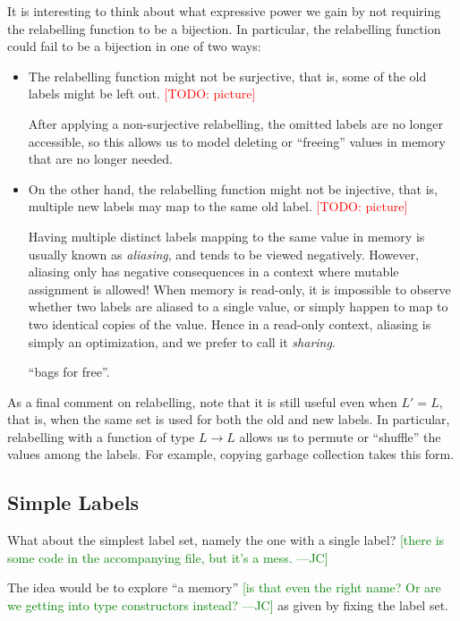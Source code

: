 \documentclass{jfp}
\newcommand{\term}[1]{\emph{#1}}
\newcommand{\authornote}[3]{\textcolor{#1}{[#3 ---#2]}}
\newcommand{\todo}[1]{\textcolor{red}{[TODO: #1]}}
\newcommand{\authornote}[3]{}
\newcommand{\todo}[1]{}
\newcommand{\jc}[1]{\authornote{green}{JC}{#1}}  %
\begin{document}
It is interesting to think about what expressive power we gain by not
requiring the relabelling function to be a bijection.  In particular,
the relabelling function could fail to be a bijection in one of two
ways:

\begin{itemize}
\item The relabelling function might not be surjective, that is, some
  of the old labels might be left out.   \todo{picture}

  After applying a non-surjective relabelling, the omitted labels are
  no longer accessible, so this allows us to model deleting or
  ``freeing'' values in memory that are no longer needed.
\item On the other hand, the relabelling function might not be
  injective, that is, multiple new labels may map to the same old
  label.  \todo{picture}

  Having multiple distinct labels mapping to the same value in memory
  is usually known as \term{aliasing}, and tends to be viewed
  negatively.  However, aliasing only has negative consequences in a
  context where mutable assignment is allowed!  When memory is
  read-only, it is impossible to observe whether two labels are
  aliased to a single value, or simply happen to map to two identical
  copies of the value.  Hence in a read-only context, aliasing is
  simply an optimization, and we prefer to call it \term{sharing}.

  \begin{commentary}
  ``bags for free''.
  \end{commentary}
\end{itemize}

As a final comment on relabelling, note that it is still useful even
when $L' = L$, that is, when the same set is used for both the old and
new labels.  In particular, relabelling with a function of type
$L \to L$ allows us to permute or ``shuffle'' the values among the
labels.  For example, copying garbage collection takes this form.

\subsection{Simple Labels}

What about the simplest label set, namely the one with a single label?
\jc{there is some code in the accompanying file, but it's a mess.}

The idea would be to explore ``a memory'' \jc{is that even the right
name? Or are we getting into type constructors instead?} as given by
fixing the label set.
\end{document}
